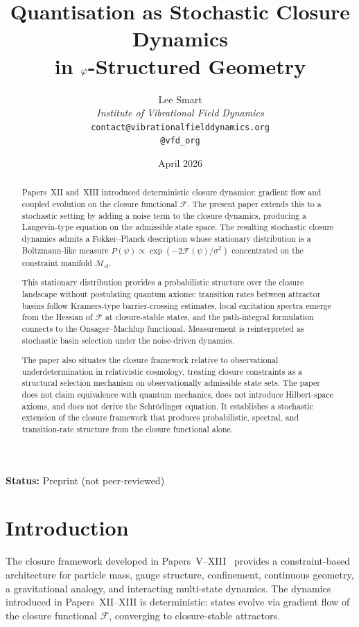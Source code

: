 \documentclass[12pt]{article}
\title{Quantisation as Stochastic Closure Dynamics\\in $\varphi$-Structured Geometry}
\author{%
  Lee Smart\\[4pt]
  \textit{Institute of Vibrational Field Dynamics}\\[2pt]
  \texttt{contact@vibrationalfielddynamics.org}\\[2pt]
  \texttt{@vfd\_org}%
}
\date{April 2026}
\newcommand{\Mcl}{\mathcal{M}_{\mathrm{cl}}}
\newcommand{\Fcal}{\mathcal{F}}
\begin{document}
\maketitle

\noindent\textbf{Status:} Preprint (not peer-reviewed)

\begin{abstract}
Papers~XII and~XIII introduced deterministic closure dynamics: gradient flow and coupled evolution on the closure functional $\Fcal$. The present paper extends this to a stochastic setting by adding a noise term to the closure dynamics, producing a Langevin-type equation on the admissible state space. The resulting stochastic closure dynamics admits a Fokker--Planck description whose stationary distribution is a Boltzmann-like measure $P(\psi) \propto \exp(-2\Fcal(\psi)/\sigma^2)$ concentrated on the constraint manifold $\Mcl$.

This stationary distribution provides a probabilistic structure over the closure landscape without postulating quantum axioms: transition rates between attractor basins follow Kramers-type barrier-crossing estimates, local excitation spectra emerge from the Hessian of $\Fcal$ at closure-stable states, and the path-integral formulation connects to the Onsager--Machlup functional. Measurement is reinterpreted as stochastic basin selection under the noise-driven dynamics.

The paper also situates the closure framework relative to observational underdetermination in relativistic cosmology, treating closure constraints as a structural selection mechanism on observationally admissible state sets. The paper does not claim equivalence with quantum mechanics, does not introduce Hilbert-space axioms, and does not derive the Schr\"odinger equation. It establishes a stochastic extension of the closure framework that produces probabilistic, spectral, and transition-rate structure from the closure functional alone.
\end{abstract}

\section{Introduction}\label{sec:intro}

The closure framework developed in Papers~V--XIII~\citep{SmartV, SmartIX, SmartXII, SmartXIII} provides a constraint-based architecture for particle mass, gauge structure, confinement, continuous geometry, a gravitational analogy, and interacting multi-state dynamics. The dynamics introduced in Papers~XII--XIII is deterministic: states evolve via gradient flow of the closure functional $\Fcal$, converging to closure-stable attractors.
\end{document}

